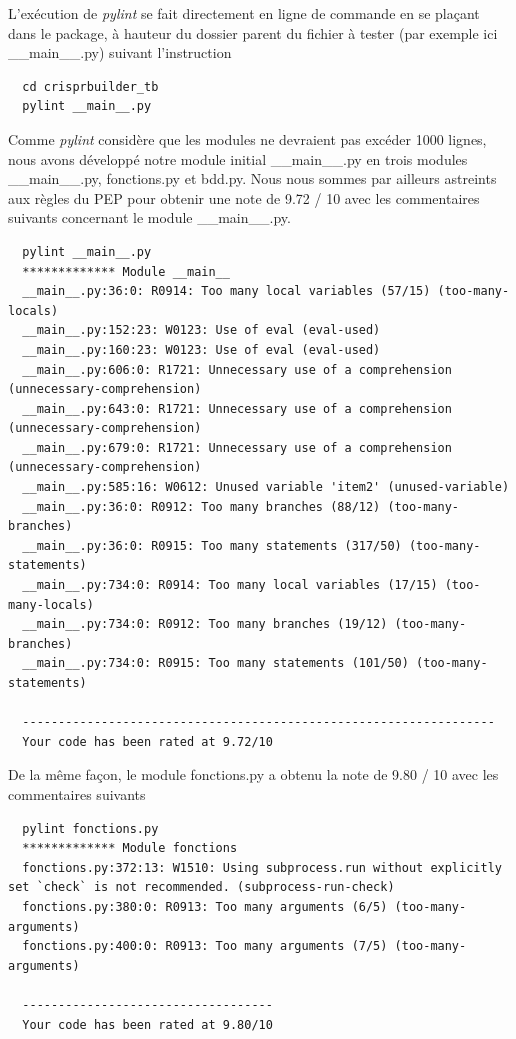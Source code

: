 \documentclass[twoside,a4paper,11pt,frenchb,openany]{report}
\begin{document}
L'exécution de \textit{pylint} se fait directement en ligne de commande en se plaçant dans le package, à hauteur du dossier parent du fichier à tester (par exemple ici \_\_main\_\_.py) suivant l'instruction

\begin{verbatim}  cd crisprbuilder_tb
  pylint __main__.py\end{verbatim}

Comme \textit{pylint} considère que les modules ne devraient pas excéder 1000 lignes, nous avons développé notre module initial \_\_main\_\_.py en trois modules \_\_main\_\_.py, fonctions.py et bdd.py. Nous nous sommes par ailleurs astreints aux règles du PEP pour obtenir une note de 9.72 / 10 avec les commentaires suivants concernant le module \_\_main\_\_.py. 

\begin{verbatim}  pylint __main__.py
  ************* Module __main__
  __main__.py:36:0: R0914: Too many local variables (57/15) (too-many-locals)
  __main__.py:152:23: W0123: Use of eval (eval-used)
  __main__.py:160:23: W0123: Use of eval (eval-used)
  __main__.py:606:0: R1721: Unnecessary use of a comprehension (unnecessary-comprehension)
  __main__.py:643:0: R1721: Unnecessary use of a comprehension (unnecessary-comprehension)
  __main__.py:679:0: R1721: Unnecessary use of a comprehension (unnecessary-comprehension)
  __main__.py:585:16: W0612: Unused variable 'item2' (unused-variable)
  __main__.py:36:0: R0912: Too many branches (88/12) (too-many-branches)
  __main__.py:36:0: R0915: Too many statements (317/50) (too-many-statements)
  __main__.py:734:0: R0914: Too many local variables (17/15) (too-many-locals)
  __main__.py:734:0: R0912: Too many branches (19/12) (too-many-branches)
  __main__.py:734:0: R0915: Too many statements (101/50) (too-many-statements)

  ------------------------------------------------------------------
  Your code has been rated at 9.72/10\end{verbatim}

De la même façon, le module fonctions.py a obtenu la note de 9.80 / 10 avec les commentaires suivants

\begin{verbatim}  pylint fonctions.py
  ************* Module fonctions
  fonctions.py:372:13: W1510: Using subprocess.run without explicitly set `check` is not recommended. (subprocess-run-check)
  fonctions.py:380:0: R0913: Too many arguments (6/5) (too-many-arguments)
  fonctions.py:400:0: R0913: Too many arguments (7/5) (too-many-arguments)

  -----------------------------------
  Your code has been rated at 9.80/10\end{verbatim}
\end{document}
